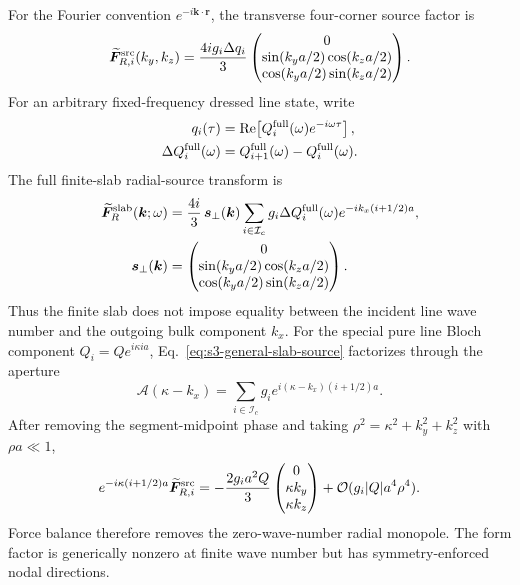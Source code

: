 \documentclass[10pt,aps,pre,reprint,floatfix,notitlepage,nofootinbib]{revtex4-2}
\newcommand{\vk}{\bm{k}}
\newcommand{\vF}{\bm{F}}
\newcommand{\vrr}{\bm{r}}
\newcommand{\order}{\mathcal O}
\newcommand{\Ic}{\mathcal I_c}
\begin{document}
For the Fourier convention $e^{-i\vk\cdot\vrr}$, the transverse four-corner source factor is
\begin{equation}
  \widetilde{\vF}^{\rm src}_{R,i}(k_y,k_z)
  =\frac{4ig_i\Delta q_i}{3}
  \begin{pmatrix}
    0\\
    \sin(k_ya/2)\cos(k_za/2)\\
    \cos(k_ya/2)\sin(k_za/2)
  \end{pmatrix}.
  \label{eq:s3-local-fourier}
\end{equation}
For an arbitrary fixed-frequency dressed line state, write
\begin{align}
 q_i(\tau)&=\operatorname{Re}\!\left[Q_i^{\rm full}(\omega)e^{-i\omega\tau}\right],\\
 \Delta Q_i^{\rm full}(\omega)&=Q_{i+1}^{\rm full}(\omega)-Q_i^{\rm full}(\omega).
 \label{eq:s3-fixed-frequency-phasor}
\end{align}
The full finite-slab radial-source transform is
\begin{align}
  \widetilde{\vF}^{\rm slab}_{R}(\vk;\omega)
  &=\frac{4i}{3}\,\bm s_\perp(\vk)
  \sum_{i\in\Ic}g_i\Delta Q_i^{\rm full}(\omega)
  e^{-ik_x(i+1/2)a},\\
  \bm s_\perp(\vk)
  &=\begin{pmatrix}
    0\\
    \sin(k_ya/2)\cos(k_za/2)\\
    \cos(k_ya/2)\sin(k_za/2)
  \end{pmatrix}.
  \label{eq:s3-general-slab-source}
\end{align}
Thus the finite slab does not impose equality between the incident line wave number and the outgoing bulk component $k_x$. For the special pure line Bloch component $Q_i=Qe^{i\kappa ia}$, Eq.~\eqref{eq:s3-general-slab-source} factorizes through the aperture
\begin{equation}
  \mathcal A(\kappa-k_x)
  =\sum_{i\in\Ic}g_i
   e^{i(\kappa-k_x)(i+1/2)a}.
  \label{eq:s3-aperture}
\end{equation}
After removing the segment-midpoint phase and taking
$\rho^2=\kappa^2+k_y^2+k_z^2$ with $\rho a\ll1$,
\begin{equation}
 e^{-i\kappa(i+1/2)a}
 \widetilde{\vF}^{\rm src}_{R,i}
 =-\frac{2g_i a^2Q}{3}
  \begin{pmatrix}0\\ \kappa k_y\\ \kappa k_z\end{pmatrix}
 +\order(g_i|Q|a^4\rho^4).
 \label{eq:s3-long-wave-source}
\end{equation}
Force balance therefore removes the zero-wave-number radial monopole.  The form factor is generically nonzero at finite wave number but has symmetry-enforced nodal directions.
\end{document}
